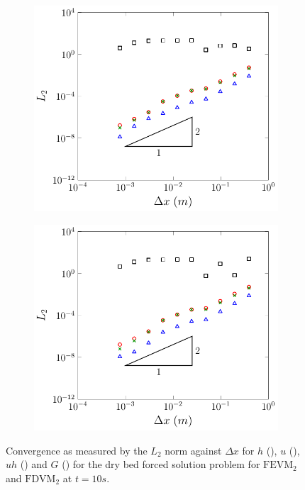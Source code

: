 \begin{figure}
	\centering
	\begin{subfigure}{0.5\textwidth}
		\includegraphics[width=\textwidth]{./chp5/figures/Forced/Dry/FEVML2.pdf}
	\end{subfigure}%
	\begin{subfigure}{0.5\textwidth}
		\includegraphics[width=\textwidth]{./chp5/figures/Forced/Dry/FDVML2.pdf}
	\end{subfigure}
	\caption{Convergence as measured by the $L_2$ norm against $\Delta x$ for $h$ (), $u$ (),  $uh$ ({})  and $G$ () for the dry bed forced solution problem for $\text{FEVM}_2$ and $\text{FDVM}_2$ at $t=10s$.}
	\label{fig:ForcedSolDryL1}
\end{figure}

